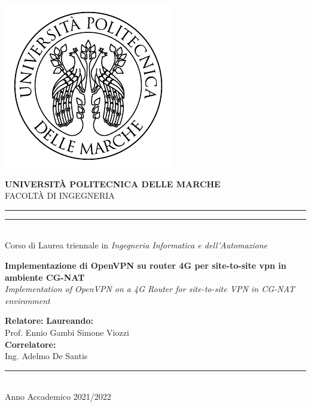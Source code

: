 \begin{titlepage}

\begin{center}
\includegraphics[scale=0.85]{immagini/UnivpmLogo.pdf} \\
\vspace{5mm}

{{\Large{\textbf{\large{UNIVERSITÀ POLITECNICA DELLE MARCHE}}}}} \\
\vspace{3mm}
\small{FACOLTÀ DI INGEGNERIA}\\
\vspace{3.5mm}

\rule[0.1cm]{\textwidth}{0.1mm}
\rule[0.5cm]{\textwidth}{0.6mm} 
\\

\large{{Corso di Laurea triennale in \textit{Ingegneria Informatica e dell'Automazione}}} \\

\end{center}

\vspace{18mm}
\begin{center}
{\LARGE{\bf{Implementazione di OpenVPN su router 4G per site-to-site vpn in ambiente CG-NAT}}}\\
\vspace{6mm}
\Large{\textit{Implementation of OpenVPN on a 4G Router for site-to-site VPN  in CG-NAT environment}}\\
\vspace{15mm}
\end{center}

\vspace{20mm}


\noindent
\textbf{Relatore:}
\hfill
\textbf{Laureando:} \\
\noindent
Prof. Ennio Gambi
\hfill
Simone Viozzi \\
\noindent
\textbf{Correlatore:} \\
Ing. Adelmo De Santis



\vfill
\begin{center}
\rule[0.1cm]{\textwidth}{0.1mm} \\
{\large{
Anno Accademico 2021/2022 }}
\end{center}
\end{titlepage}
\restoregeometry
